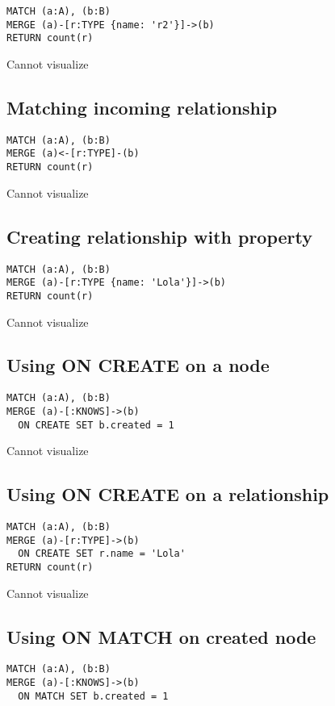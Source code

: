 \begin{lstlisting}
MATCH (a:A), (b:B)
MERGE (a)-[r:TYPE {name: 'r2'}]->(b)
RETURN count(r)
\end{lstlisting}

Cannot visualize
\subsection{Matching incoming relationship}

\begin{lstlisting}
MATCH (a:A), (b:B)
MERGE (a)<-[r:TYPE]-(b)
RETURN count(r)
\end{lstlisting}

Cannot visualize
\subsection{Creating relationship with property}

\begin{lstlisting}
MATCH (a:A), (b:B)
MERGE (a)-[r:TYPE {name: 'Lola'}]->(b)
RETURN count(r)
\end{lstlisting}

Cannot visualize
\subsection{Using ON CREATE on a node}

\begin{lstlisting}
MATCH (a:A), (b:B)
MERGE (a)-[:KNOWS]->(b)
  ON CREATE SET b.created = 1
\end{lstlisting}

Cannot visualize
\subsection{Using ON CREATE on a relationship}

\begin{lstlisting}
MATCH (a:A), (b:B)
MERGE (a)-[r:TYPE]->(b)
  ON CREATE SET r.name = 'Lola'
RETURN count(r)
\end{lstlisting}

Cannot visualize
\subsection{Using ON MATCH on created node}

\begin{lstlisting}
MATCH (a:A), (b:B)
MERGE (a)-[:KNOWS]->(b)
  ON MATCH SET b.created = 1
\end{lstlisting}

